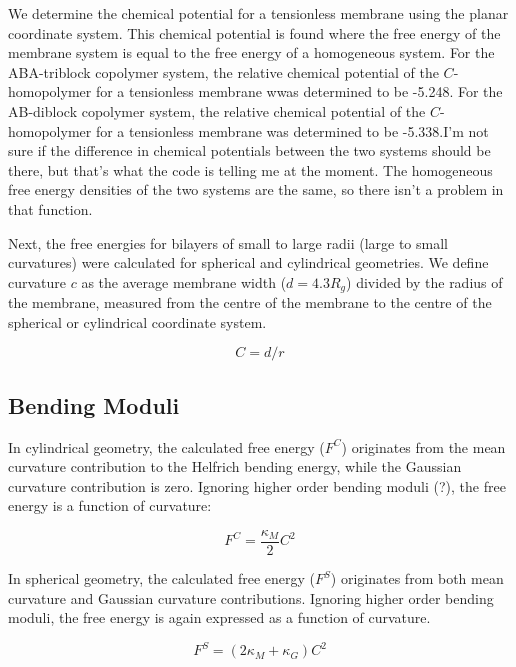 \documentclass[11pt]{article} %
\begin{document}
We determine the chemical potential for a tensionless membrane using the planar coordinate system. This chemical potential is found where the free energy of the membrane system is equal to the free energy of a homogeneous system. For the ABA-triblock copolymer system, the relative chemical potential of the $C$-homopolymer for a tensionless membrane wwas determined to be -5.248. For the AB-diblock copolymer system, the relative chemical potential of the $C$-homopolymer for a tensionless membrane was determined to be -5.338.I'm not sure if the difference in chemical potentials between the two systems should be there, but that's what the code is telling me at the moment. The homogeneous free energy densities of the two systems are the same, so there isn't a problem in that function.

\noindent
Next, the free energies for bilayers of small to large radii (large to small curvatures) were calculated for spherical and cylindrical geometries. We define curvature $c$ as the average membrane width ($ d = 4.3 R_g$) divided by the radius of the membrane, measured from the centre of the membrane to the centre of the spherical or cylindrical coordinate system. 

\begin{equation}
C=d/r
\end{equation}

\subsection{Bending Moduli}

In cylindrical geometry, the calculated free energy ($F^C$) originates from the mean curvature contribution to the Helfrich bending energy, while the Gaussian curvature contribution is zero. Ignoring higher order bending moduli (?), the free energy is a function of curvature:

\begin{equation}
F^C = \frac{\kappa_M}{2} C^2
\end{equation}

\noindent
In spherical geometry, the calculated free energy ($F^S$) originates from both mean curvature and Gaussian curvature contributions. Ignoring higher order bending moduli, the free energy is again expressed as a function of curvature.

\begin{equation}
F^S = (2 \kappa_M + \kappa_G)C^2
\end{equation}
\end{document}
